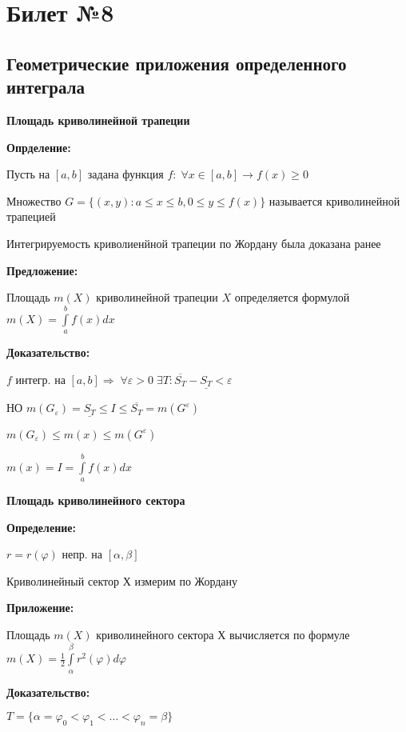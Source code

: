 \documentclass[a4paper,12pt]{article} %
\begin{document}
\section*{Билет №8}

\subsection*{Геометрические приложения определенного интеграла}

\textbf{Площадь криволинейной трапеции}
\vspace{20}

\textbf{Опрделение:}


Пусть на $[a, b]$ задана функция $f:\; \forall x \in[a, b] \rightarrow f(x) \geq 0$

Множество $G=\{(x,y): a\leq x \leq b, 0 \leq y \leq f(x)\}$ называется криволинейной трапецией

Интегрируемость криволиенйной трапеции по Жордану была доказана ранее

\vspace{20}

\textbf{Предложение:}

Площадь $m(X)$ криволинейной трапеции $X$ определяется формулой $m(X) = \int\limits_a^b f(x)dx$

\textbf{Доказательство:} 

$f$ интегр. на $[a, b] \Rightarrow \; \forall \varepsilon > 0 \; \exists T: \overline{S_T} - \underline{S_T} < \varepsilon$

НО $m(G_{\varepsilon}) = \underline{S_T} \leq I \leq \overline{S_T} = m(G^{\varepsilon}) $

$m(G_{\varepsilon}) \leq m(x) \leq m(G^{\varepsilon})$

$m(x) = I = \int\limits_a^b f(x)dx$

\vspace{20}

\textbf{Площадь криволинейного сектора}

\textbf{Определение:}

$r=r(\varphi)$ непр. на $[\alpha, \beta]$

Криволинейный сектор $Х$ измерим по Жордану

\textbf{Приложение:}

Площадь $m(X)$ криволинейного сектора $Х$ вычисляется по формуле $m(X) =  \frac{1}{2} \int\limits_{\alpha}^{\beta} r^2(\varphi)d\varphi$

\textbf{Доказательство:}

$T = \{\alpha = \varphi_0 < \varphi_1 <\dots < \varphi_n = \beta\}$
\end{document}
